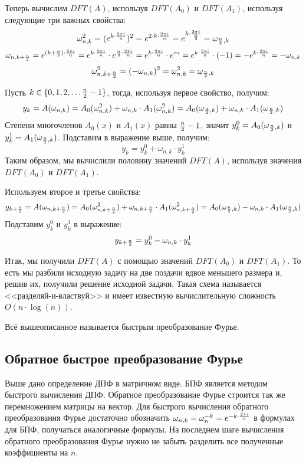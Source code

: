 Теперь вычислим $DFT(A)$, используя $DFT(A_0)$ и $DFT(A_1)$, используя следующие три важных свойства:
$${\omega^2_{n, k}} = (e ^ {k \cdot {{2 \pi i} \over {n}}}) ^ 2 = e ^ {2 \cdot k \cdot {{2 \pi i} \over {n}}} = e ^ {k \cdot {{2 \pi i} \over {n \over 2}}} = {{\omega}_{{n \over 2}, k}}$$
$${{\omega}_{n, {k + {n \over 2}}}} = e ^ {{(k + {n \over 2})} \cdot {{2 \pi i} \over {n}}} = e ^ {k \cdot {{2 \pi i} \over {n}}} \cdot e ^ {{n \over 2} \cdot {{2 \pi i} \over {n}}} = e ^ {k \cdot {{2 \pi i} \over {n}}} \cdot e ^ {\pi i} = e ^ {k \cdot {{2 \pi i} \over {n}}} \cdot (-1) = -e ^ {k \cdot {{2 \pi i} \over {n}}} = -{{\omega}_{n, k}}$$
$${\omega^2_{n, {k + {n \over 2}}}} = (-{{\omega}_{n, k}}) ^ 2 = {\omega^2_{n, k}} =  {{\omega}_{{n \over 2}, k}}$$

Пусть $k \in \{ 0, 1, 2, \dots {n \over 2} - 1 \}$, тогда, используя первое свойство, получим:
$$ y_k = A(\omega_{n, k}) = A_0(\omega ^ 2_{n, k}) + \omega_{n, k} \cdot A_1(\omega ^ 2_{n, k}) = A_0({{\omega}_{{n \over 2}, k}}) + \omega_{n, k} \cdot A_1({{\omega}_{{n \over 2}, k}}) $$
Степени многочленов $A_0(x)$ и $A_1(x)$ равны ${n \over 2} - 1$, значит $y^0_k = A_0({{\omega}_{{n \over 2}, k}})$ и $y^1_k = A_1({{\omega}_{{n \over 2}, k}})$. Подставим в выражение выше, получим:
$$ y_k = y^0_k + \omega_{n, k} \cdot y^1_k $$
Таким образом, мы вычислили половину значений $DFT(A)$, используя значения $DFT(A_0)$ и $DFT(A_1)$.

Используем второе и третье свойства:
$$ y_{k + {n \over 2}} = A(\omega_{n, {k + {n \over 2}}}) = A_0(\omega ^ 2_{n, {k + {n \over 2}}}) + \omega_{n, {k + {n \over 2}}} \cdot A_1(\omega ^ 2_{n, {k + {n \over 2}}}) = A_0({{\omega}_{{n \over 2}, k}}) - \omega_{n, k} \cdot A_1({{\omega}_{{n \over 2}, k}}) $$
Подставим $y^0_k$ и $y^1_k$ в выражение:
$$ y_{k + {n \over 2}} = y^0_k - \omega_{n, k} \cdot y^1_k $$

Итак, мы получили $DFT(A)$ с помощью значений $DFT(A_0)$ и $DFT(A_1)$. То есть мы разбили исходную задачу на две поздачи вдвое меньшего размера и, решив их, получили решение исходной задачи. Такая схема называется <<разделяй-и-властвуй>> и имеет известную вычислительную сложность $O(n \cdot \log(n))$.

Всё вышеописанное называется быстрым преобразование Фурье.

\pagebreak

\subsection*{Обратное быстрое преобразование Фурье}
Выше дано определение ДПФ в матричном виде. БПФ является методом быстрого вычисления ДПФ. Обратное преобразование Фурье строится так же перемножением матрицы на вектор. Для быстрого вычисления обратного преобразования Фурье достаточно обозначить $\omega_{n, k} = {\omega}_{n} ^ {-k} = e ^ {-k \cdot {{2 \pi i} \over {n}}}$ в формулах для БПФ, получаться аналогичные формулы. На последнем шаге вычисления обратного преобразования Фурье нужно не забыть разделить все полученные коэффициенты на $n$.

